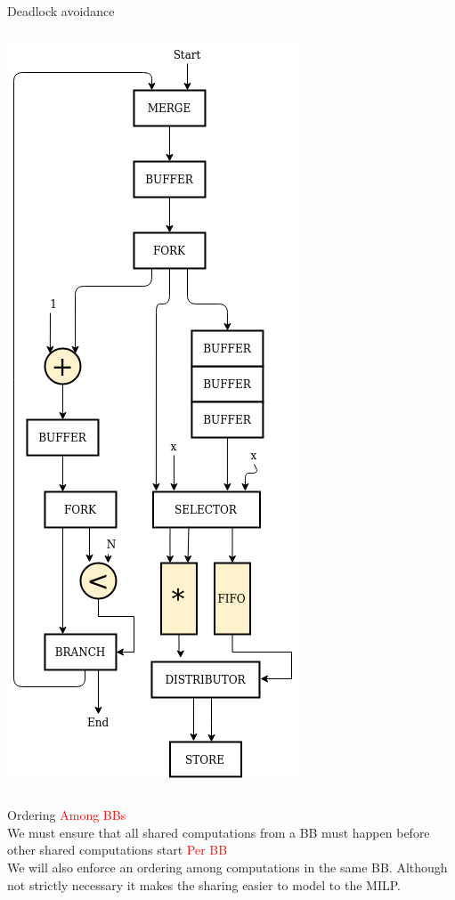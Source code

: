 \documentclass{beamer}
\renewcommand{\emph}{\textcolor{red}}
\begin{document}
\begin{frame}{Deadlock avoidance}
\begin{columns}[T]
    \begin{column}{0.25\textwidth}
        \begin{center}
      \includegraphics[scale=0.25]{blocking_shared.png}
    \end{center}
    \end{column}
  \end{columns}
\end{frame}
\begin{frame}{Ordering}
\emph{Among BBs} \\
We must ensure that all shared computations from a BB must happen before other shared computations start \newline \newline
\emph{Per BB} \\
We will also enforce an ordering among computations in the same BB. Although not strictly necessary it makes the sharing easier to model to the MILP.
\end{frame}
\end{document}
